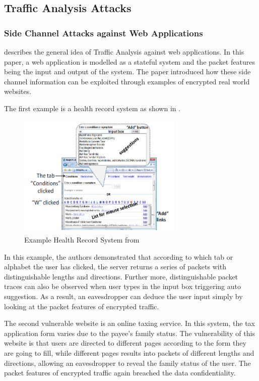 \subsection{Traffic Analysis Attacks} \label{Subsec: Traffic Analysis Attacks}

\subsubsection{Side Channel Attacks against Web Applications}
\cite{WebSideChannel} describes the general idea of Traffic Analysis against web applications. In this paper, a web application is modelled as a stateful system and the packet features being the input and output of the system. The paper introduced how these side channel information can be exploited through examples of encrypted real world websites.
\begin{example}
	The first example is a health record system as shown in .
	
	\begin{figure}[h!]
		\center
		\includegraphics[width=0.7\textwidth]{fig/WebSideChannelExample1.png}
		\caption{Example Health Record System from \cite{WebSideChannel}}
		\label{Fig: HealthRecordSystem}
	\end{figure}
	
	In this example, the authors demonstrated that according to which tab or alphabet the user has clicked, the server returns a series of  packets with distinguishable lengths and directions. Further more, distinguishable packet traces can also be observed when user types in the input box triggering auto suggestion. As a result, an eavesdropper can deduce the user input simply by looking at the packet features of encrypted traffic.
\end{example}

\begin{example}
	The second vulnerable website is an online taxing service. In this system, the tax application form varies due to the payee's family status. The vulnerability of this website is that users are directed to different pages according to the form they are going to fill, while different pages results into packets of different lengths and directions, allowing an eavesdropper to reveal the family status of the user. The packet features of encrypted traffic again breached the data confidentiality.
\end{example}

